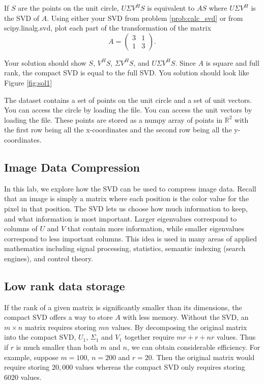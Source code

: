 \begin{problem}
If $S$ are the points on the unit circle, $U\Sigma V^HS$ is equivalent to $AS$ where $U\Sigma V^H$ is the SVD of $A$. Using either your SVD from problem \ref{prob:calc_svd} or from scipy.linalg.svd, plot each part of the transformation of the matrix
\begin{equation}
A =  \begin{pmatrix}3 & 1\\1 & 3\end{pmatrix}.
\end{equation}

Your solution should show $S$, $V^HS$, $\Sigma V^HS$, and $U\Sigma V^HS$.
Since $A$ is square and full rank, the compact SVD is equal to the full SVD.
You solution should look like Figure \ref{fig:sol1}

The  dataset contains a set of points on the unit circle and a set of unit vectors. You can access the circle by loading the  file. You can access the unit vectors by loading the  file. These points are stored as a numpy array of points in $\mathbb{R}^2$ with the first row being all the x-coordinates and the second row being all the y-coordinates.
\end{problem}


\subsection*{Image Data Compression}

In this lab, we explore how the SVD can be used to compress image data.
Recall that an image is simply a matrix where each position is the color value for the pixel in that position.
The SVD lets us choose how much information to keep, and what information is most important.
Larger eigenvalues correspond to columns of $U$ and $V$ that contain more information, while smaller eigenvalues correspond to less important columns.
This idea is used in many areas of applied mathematics including signal processing, statistics, semantic indexing (search engines), and control theory.


\subsection*{Low rank data storage}
If the rank of a given matrix is significantly smaller than its dimensions, the compact SVD offers a way to store $A$ with less memory.
Without the SVD, an $m\times n$ matrix requires storing $mn$ values.
By decomposing the original matrix into the compact SVD, $U_1$, $\Sigma_1$ and $V_1$ together require $mr+r+nr$ values.
Thus if $r$ is much smaller than both $m$ and $n$, we can obtain considerable efficiency.
For example, suppose $m=100$, $n=200$ and $r=20$.
Then the original matrix would require storing $20,000$ values whereas the compact SVD only requires storing $6020$ values.

